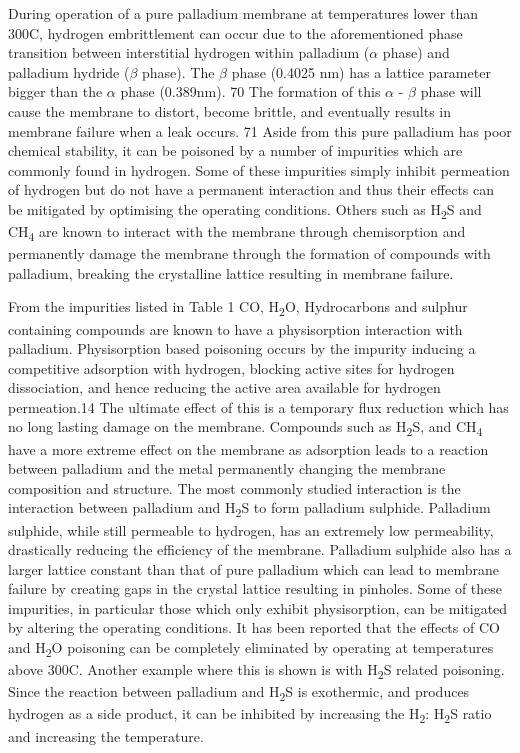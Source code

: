 During operation of a pure palladium membrane at temperatures lower than 300\textdegree C, 
hydrogen embrittlement can occur due to the aforementioned phase transition between 
interstitial hydrogen within palladium ($\alpha$ phase) and palladium hydride ($\beta$ phase). 
The $\beta$ phase (0.4025 nm) has a lattice parameter bigger than the $\alpha$ phase 
(0.389nm). 70  The formation of this $\alpha$ - $\beta$ phase will cause the membrane to distort, 
become brittle, and eventually results in membrane failure when a leak occurs. 71 
Aside from this pure palladium has poor chemical stability, it can be poisoned by a 
number of impurities which are commonly found in hydrogen. Some of these impurities 
simply inhibit permeation of hydrogen but do not have a permanent interaction and thus 
their effects can be mitigated by optimising the operating conditions. Others such as 
H\textsubscript{2}S and CH\textsubscript{4} are known to interact with the membrane through chemisorption and permanently 
damage the membrane through the formation of compounds with palladium, breaking the 
crystalline lattice resulting in membrane failure.  

From the impurities listed in Table 1 CO, H\textsubscript{2}O, Hydrocarbons and sulphur 
containing compounds are known to have a physisorption interaction with palladium. 
Physisorption based poisoning occurs by the impurity inducing a competitive adsorption 
with hydrogen, blocking active sites for hydrogen dissociation, and hence reducing the 
active area available for hydrogen permeation.14 The ultimate effect of this is a temporary 
flux reduction which has no long lasting damage on the membrane. Compounds such as 
H\textsubscript{2}S, and CH\textsubscript{4} have a more extreme effect on the membrane as 
adsorption leads to a reaction between palladium and the metal permanently changing the 
membrane composition and structure. The most commonly studied interaction is the interaction 
between palladium and H\textsubscript{2}S to form palladium sulphide. Palladium sulphide, while still
permeable to hydrogen, has an extremely low permeability, drastically reducing the efficiency 
of the membrane. Palladium sulphide also has a larger lattice constant than that of pure 
palladium which can lead to membrane failure by creating gaps in the crystal lattice 
resulting in pinholes. Some of these impurities, in particular those which only exhibit 
physisorption, can be mitigated by altering the operating conditions. It has been reported 
that the effects of CO and H\textsubscript{2}O poisoning can be completely eliminated by operating at 
temperatures above 300\textdegree C. Another example where this is shown is with H\textsubscript{2}S related poisoning. 
Since the reaction between palladium and H\textsubscript{2}S is exothermic, and produces hydrogen as a side 
product, it can be inhibited by increasing the H\textsubscript{2}: H\textsubscript{2}S ratio and increasing the temperature.  

